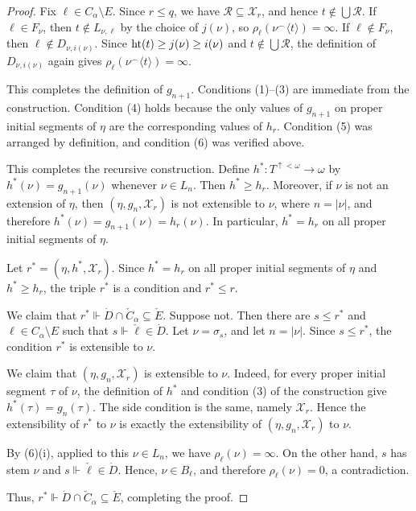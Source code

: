 \begin{proof}
Fix $\ell\in C_\alpha\setminus E$.  Since $r\leq q$, we have
$\mathcal R\subseteq\mathcal X_r$, and hence $t\notin\bigcup\mathcal R$.
If $\ell\in F_\nu$, then $t\notin L_{\nu,\ell}$ by the choice of $j(\nu)$,
so $\rho_\ell(\nu^\frown\langle t\rangle)=\infty$.  If
$\ell\notin F_\nu$, then $\ell\notin D_{\nu,i(\nu)}$.  Since
$\operatorname{ht}(t)\geq j(\nu)\geq i(\nu)$ and
$t\notin\bigcup\mathcal R$, the definition of $D_{\nu,i(\nu)}$ again gives $\rho_\ell(\nu^\frown\langle t\rangle)=\infty$.

This completes the definition of $g_{n+1}$.  Conditions (1)--(3) are
immediate from the construction.  Condition (4) holds because the only values
of $g_{n+1}$ on proper initial segments of $\eta$ are the corresponding
values of $h_r$.  Condition (5) was arranged by definition, and condition
(6) was verified above.

This completes the recursive construction.
Define $h^*:T^{\uparrow<\omega}\to\omega$ by $h^*(\nu)=g_{n+1}(\nu)$ whenever $\nu\in L_n$.
Then $h^*\geq h_r$.  Moreover, if $\nu$ is not an extension of $\eta$, then
$(\eta,g_n,\mathcal X_r)$ is not extensible to $\nu$, where $n=|\nu|$, and
therefore $h^*(\nu)=g_{n+1}(\nu)=h_r(\nu)$.  In particular, $h^*=h_r$ on all
proper initial segments of $\eta$.

Let $r^*=(\eta,h^*,\mathcal X_r)$.  Since $h^*=h_r$ on all proper
initial segments of $\eta$ and $h^*\geq h_r$, the triple $r^*$ is a
condition and $r^*\leq r$.

We claim that $r^*\Vdash \dot D\cap \check C_\alpha\subseteq \check E$.
Suppose not.  Then there are $s\leq r^*$ and $\ell\in C_\alpha\setminus E$ such that $s\Vdash \check \ell\in\dot D$.
Let $\nu=\sigma_s$, and let $n=|\nu|$.  Since $s\leq r^*$, the condition
$r^*$ is extensible to $\nu$.

We claim that $(\eta,g_n,\mathcal X_r)$ is extensible to $\nu$.  Indeed, for
every proper initial segment $\tau$ of $\nu$, the definition of $h^*$ and
condition (3) of the construction give $h^*(\tau)=g_n(\tau)$.
The side condition is the same, namely $\mathcal X_r$.  Hence the
extensibility of $r^*$ to $\nu$ is exactly the extensibility of
$(\eta,g_n,\mathcal X_r)$ to $\nu$.

By (6)(i), applied to this $\nu\in L_n$, we have $\rho_\ell(\nu)=\infty$.
On the other hand, $s$ has stem $\nu$ and $s \Vdash \check \ell\in\dot D$.  Hence,
$\nu\in B_\ell$, and therefore $\rho_\ell(\nu)=0$, a contradiction.

Thus, $r^*\Vdash \dot D\cap \check C_\alpha\subseteq \check E$, completing the proof.
\end{proof}

